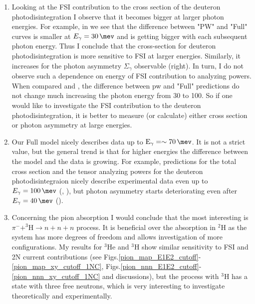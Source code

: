\begin{enumerate}
    \item Looking at the FSI contribution to the cross section of the deuteron photodisintegration 
    I observe that it becomes bigger at larger photon energies.
    For example, in  we see that the difference between "PW" and "Full" curves
    is smaller at $E_\gamma = \SI{30}{\mev}$ and is getting bigger with each subsequent photon energy. Thus I conclude that the cross-section for deuteron photodisintegration is 
    more sensitive to FSI at larger energies.
    Similarly, it increases for the photon asymmetry $\Sigma_\gamma$ observable (right).
    In turn, I do not observe such a dependence on energy of FSI contribution to analyzing powers.
    When compared  and , the difference between \gls{pw} and "Full"
    predictions do not change much increasing the photon energy from \SI{30}{\mev} to \SI{100}{\mev}.
    So if one would like to investigate the FSI contribution to the deuteron photodisintegration,
    it is better to measure (or calculate) either cross section or photon asymmetry at large energies.
    \item Our Full model nicely describes data up to $\text{E}_\gamma = \sim\SI{70}{\mev}$. It is not a strict value, but the general trend is that for higher energies the difference between the model and the data is growing. For example, predictions for the total cross section and the tensor analyzing powers for the deuteron photodisintegraion nicely describe experimental data even up to $E_\gamma = \SI{100}{\mev}$ (, ), but photon asymmetry starts deteriorating even after $E_\gamma = \SI{40}{\mev}$ ().
    \item Concerning the pion absorption I would conclude that the most interesting is 
    $\pi^- + ^3\text{H} \rightarrow n + n + n$ process.
    It is beneficial over the absorption in $^2$H as the system has more degrees of freedom and allows
    investigation of more configurations.
    My results for $^3$He and $^3$H show similar sensitivity to FSI and 2N current contributions
    (see Figs.\ref{pion_map_E1E2_cutoff}-\ref{pion_map_xy_cutoff_1NC}, Figs.\ref{pion_nnn_E1E2_cutoff}-\ref{pion_nnn_xy_cutoff_1NC}
    and discussions), but the process with $^3$H has a state with three free neutrons, which is very interesting
    to investigate theoretically and experimentally.
\end{enumerate}